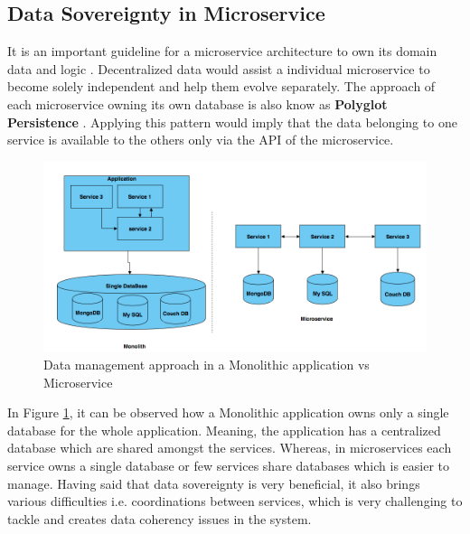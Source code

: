     \newpage
    \subsection{Data Sovereignty in Microservice}
    \label{subsection:dataSovereignty}
    It is an important guideline for a microservice architecture to own its domain data and 
    logic \cite[p.~29]{Torre2017}. Decentralized data would assist a individual microservice
    to become solely independent and help them evolve separately. The approach of each microservice owning its own database is also
    know as \textbf{Polyglot Persistence} \cite{Polyglot}. Applying this pattern would imply that the
    data belonging to one service is available to the others only via the API of the microservice.

    \begin{figure}[H]
        \centering \includegraphics[scale=0.4]{grafiken/polyglot.png}
        \caption{Data management approach in a Monolithic application vs Microservice \cite{FowlerMartin}}
        \label{fig:polyglot}
    \end{figure}
    
   In Figure \ref{fig:polyglot}, it can be observed how a Monolithic application owns only a single database for the whole application. Meaning,
   the application has a centralized database which are shared amongst the services. Whereas, in microservices each service owns
   a single database or few services share databases which is easier to manage. Having said that data sovereignty is very beneficial, it also brings various difficulties
   i.e. coordinations between services, which is very challenging to tackle and creates data coherency issues in the system. 




